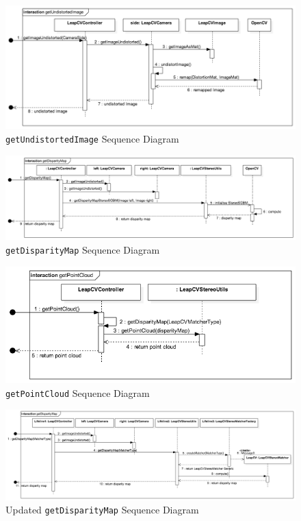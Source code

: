 \documentclass[11pt,oneside]{report}
\newcommand\code[1]{\texttt{#1}}
\begin{document}
\begin{appendices}
			\begin{figure}
			\centering
    				\includegraphics[width=\textheight, angle=90]{seq_getUndistortedImage}
    			\caption{\code{getUndistortedImage} Sequence Diagram \protect {\label{fig:seq_getUndistortedImage}}}
			\end{figure}	
			\begin{figure}
			\centering
    				\includegraphics[width=\textheight, angle=90]{seq_getDisparityMap1}
    			\caption{\code{getDisparityMap} Sequence Diagram \protect {\label{fig:seq_getDisparityMap1}}}
			\end{figure}	
			\begin{figure}
			\centering
    				\includegraphics[width=\textheight, angle=90]{seq_getPointCloud}
    			\caption{\code{getPointCloud} Sequence Diagram \protect {\label{fig:seq_getPointCloud}}}
			\end{figure}	
			\begin{figure}
			\centering
    				\includegraphics[width=\textheight, angle=90]{seq_getDisparityMap2}
    			\caption{Updated \code{getDisparityMap} Sequence Diagram \protect {\label{fig:seq_getDisparityMap2}}}
			\end{figure}	

\end{appendices}
\end{document}
